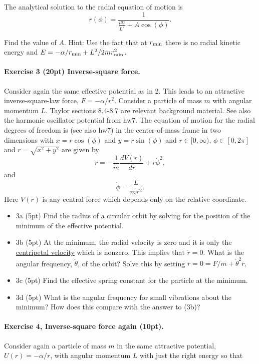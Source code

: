 \documentclass[%
oneside,                 %
final,                   %
10pt]{article}
\begin{document}
The analytical solution to the radial equation of motion is
\[
r(\phi) = \frac{1}{\frac{\mu\alpha}{L^2}+A\cos{(\phi)}}.
\]

Find the value of $A$. Hint: Use the fact that at $r_{\rm min}$
there is no radial kinetic energy and $E=-\alpha/r_{\rm min}+L^2/2mr_{\rm min}^2$.


\paragraph{Exercise 3 (20pt) Inverse-square force.}
Consider again the same effective potential as in 2. This leads to an attractive inverse-square-law force, $F=-\alpha/r^2$. Consider a particle of mass $m$ with angular momentum $L$. Taylor sections 8.4-8.7 are relevant background material.  See also the harmonic oscillator potential from hw7. The equation of motion for the radial degrees of freedom is (see also hw7) in the center-of-mass frame in two dimensions with $x=r\cos{(\phi)}$ and $y=r\sin{(\phi)}$ and
$r\in [0,\infty)$, $\phi\in [0,2\pi]$ and $r=\sqrt{x^2+y^2}$ are given by
\[
\ddot{r}=-\frac{1}{m}\frac{dV(r)}{dr}+r\dot{\phi}^2,
\]
and
\[
\dot{\phi}=\frac{L}{m r^2}.
\]
Here $V(r)$ is any central force which depends only on the relative coordinate.


\begin{itemize}
\item 3a (5pt)  Find the radius of a circular orbit by solving for the position of the minimum of the effective potential. 

\item 3b (5pt) At the minimum, the radial velocity is zero and it is only the \href{{https://en.wikipedia.org/wiki/Centripetal_force}}{centripetal velocity} which is nonzero. This implies that $\ddot{r}=0$.  What is the angular frequency, $\dot{\theta}$, of the orbit? Solve this by setting $\ddot{r}=0=F/m+\dot{\theta}^2r$.

\item 3c (5pt) Find the effective spring constant for the particle at the minimum.

\item 3d (5pt) What is the angular frequency for small vibrations about the minimum? How does this compare with the answer to (3b)?
\end{itemize}

\noindent
\paragraph{Exercise 4, Inverse-square force again (10pt).}
Consider again a  particle of mass $m$ in the same attractive potential, $U(r)=-\alpha/r$, with angular momentum $L$ with just the right energy so that
\end{document}
